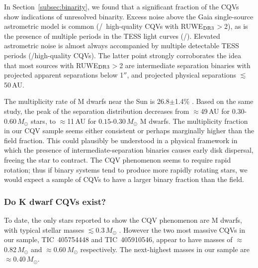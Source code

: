\documentclass[11pt,twocolumn,tighten]{aastex63}
\begin{document}
In Section~\ref{subsec:binarity}, we found that a significant fraction
of the CQVs show indications of unresolved binarity.  Excess noise
above the Gaia single-source astrometric model is common
(\ngoodhighruwe/\ngoods\ high-quality CQVs with RUWE$_{\rm DR3}$$>$2),
as is the presence of multiple periods in the TESS light curves
(\ngoodmultperiodflag/\ngoods).  Elevated astrometric noise is almost
always accompanied by multiple detectable TESS periods
(\ngoodruweandmultperiod/\ngoodhighruwe high-quality CQVs).  The
latter point strongly corroborates the idea that most sources with
RUWE$_{\rm DR3}$$>$2 are intermediate separation binaries with
projected apparent separations below 1$''$, and projected physical
separations $\lesssim$50\,AU.

The multiplicity rate of M dwarfs near the Sun is 26.8$\pm$1.4\%
\citep{2019AJ....157..216W}.  Based on the same study, the peak of the
separation distribution decreases from $\approx$49\,AU for
$0.30$-$0.60$\,$M_\odot$ stars, to $\approx$11\,AU for
$0.15$-$0.30$\,$M_\odot$ M dwarfs.  The multiplicity fraction in our
CQV sample seems either consistent or perhaps marginally higher than
the field fraction.  This could plausibly be understood in a physical
framework in which the presence of intermediate-separation binaries
causes early disk dispersal, freeing the star to contract.  The CQV
phenomenon seems to require rapid rotation; thus if binary systems
tend to produce more rapidly rotating stars, we would expect a sample
of CQVs to have a larger binary fraction than the field.


\subsubsection{Do K dwarf CQVs exist?}
\label{subsec:massive}

To date, the only stars reported to show the CQV phenomenon are M
dwarfs, with typical stellar masses $\lesssim$0.3\,$M_\odot$
\citep{2017AJ....153..152S,2022AJ....163..144G}.  However the two most
massive CQVs in our sample, TIC~405754448 and TIC~405910546, appear to
have masses of $\approx$0.82\,$M_\odot$ and $\approx$0.60\,$M_\odot$
respectively.  The next-highest masses in our sample are
$\approx$0.40\,$M_\odot$.
\end{document}
